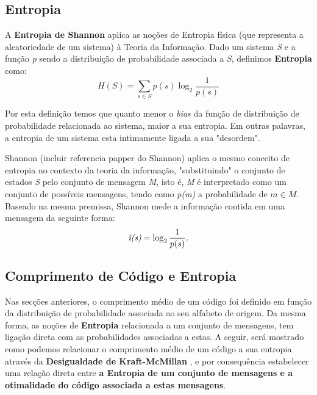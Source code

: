 \subsection{Entropia}
A \textbf{Entropia de Shannon} aplica as noções de Entropia física (que representa a aleatoriedade de um sistema) à Teoria da Informação. Dado um sistema \emph{S} e a função \emph{p} sendo a distribuição de probabilidade associada a \emph{S}, definimos \textbf{Entropia} como:
\begin{equation} \label{eq:entropy}
H(S) = \sum_{s \in S}^{} p(s) \log_2 \frac{1}{p(s)}
\end{equation}

Por esta definição temos que quanto menor o \emph{bias} da função de distribuição de probabilidade relacionada ao sistema, maior a sua entropia. Em outras palavras, a entropia de um sistema esta intimamente ligada a sua  "desordem". 

Shannon (incluir referencia papper do Shannon) aplica o mesmo conceito de entropia no contexto da teoria da informação, "substituindo" o conjunto de estados \emph{S} pelo conjunto de mensagem \emph{M}, isto é, \emph{M} é interpretado como um conjunto de possíveis mensagens, tendo como \emph{p(m)} a probabilidade de $m \in M$.
Baseado na mesma premissa, Shannon mede a informação contida em uma mensagem da seguinte forma:
\begin{equation} \label{label:info_quantity}
\emph{i(s)} = \log_2 \frac{1}{p(s)}.
\end{equation}

\subsection{Comprimento de Código e Entropia}
Nas secções anteriores, o comprimento médio de um código  foi definido em função da distribuição de probabilidade associada ao seu alfabeto de origem.
Da mesma forma, as noções de \textbf{Entropia} relacionada a um conjunto de mensagens, tem ligação direta com as probabilidades associadas a estas. 
A seguir, será mostrado como podemos relacionar o comprimento médio de um código a sua entropia através da \textbf{Desigualdade de Kraft-McMillan} , e por consequência estabelecer uma relação direta entre \textbf{a Entropia de um conjunto de mensagens e a otimalidade do código associada a estas mensagens}.

